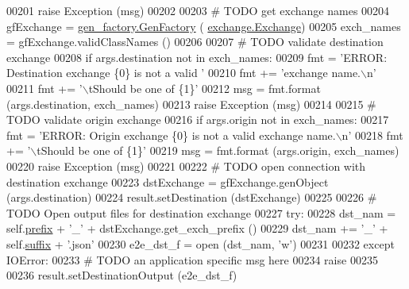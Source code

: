 \begin{DoxyCode}
00201             \textcolor{keywordflow}{raise} Exception (msg)
00202 
00203         \textcolor{comment}{# TODO get exchange names }
00204         gfExchange = \hyperlink{classgen__factory_1_1_gen_factory}{gen\_factory.GenFactory} (
      \hyperlink{classexchange_1_1_exchange}{exchange.Exchange})
00205         exch\_names = gfExchange.validClassNames ()
00206             
00207         \textcolor{comment}{# TODO validate destination exchange}
00208         \textcolor{keywordflow}{if} args.destination \textcolor{keywordflow}{not} \textcolor{keywordflow}{in} exch\_names:
00209             fmt  = \textcolor{stringliteral}{'ERROR: Destination exchange \{0\} is not a valid '}
00210             fmt += \textcolor{stringliteral}{'exchange name.\(\backslash\)n'}
00211             fmt += \textcolor{stringliteral}{'\(\backslash\)tShould be one of \{1\}'}
00212             msg = fmt.format (args.destination, exch\_names)
00213             \textcolor{keywordflow}{raise} Exception (msg)
00214             
00215         \textcolor{comment}{# TODO validate origin exchange}
00216         \textcolor{keywordflow}{if} args.origin \textcolor{keywordflow}{not} \textcolor{keywordflow}{in} exch\_names:
00217             fmt  = \textcolor{stringliteral}{'ERROR: Origin exchange \{0\} is not a valid exchange name.\(\backslash\)n'}
00218             fmt += \textcolor{stringliteral}{'\(\backslash\)tShould be one of \{1\}'}
00219             msg = fmt.format (args.origin, exch\_names)
00220             \textcolor{keywordflow}{raise} Exception (msg)
00221         
00222         \textcolor{comment}{# TODO open connection with destination exchange}
00223         dstExchange = gfExchange.genObject (args.destination)
00224         result.setDestination (dstExchange)
00225             
00226         \textcolor{comment}{# TODO Open output files for destination exchange}
00227         \textcolor{keywordflow}{try}:
00228             dst\_nam  =  self.\hyperlink{classe2e_1_1_application_a027ff25e5409ae17584978a09fc2611a}{prefix} + \textcolor{stringliteral}{'\_'} + dstExchange.get\_exch\_prefix ()
00229             dst\_nam += \textcolor{stringliteral}{'\_'} + self.\hyperlink{classe2e_1_1_application_a4d824ad36b051d2d629edb314385df0d}{suffix} + \textcolor{stringliteral}{'.json'}
00230             e2e\_dst\_f = open (dst\_nam, \textcolor{stringliteral}{'w'})
00231             
00232         \textcolor{keywordflow}{except} IOError:
00233             \textcolor{comment}{# TODO an application specific msg here}
00234             \textcolor{keywordflow}{raise}
00235             
00236         result.setDestinationOutput (e2e\_dst\_f)

\end{DoxyCode}

